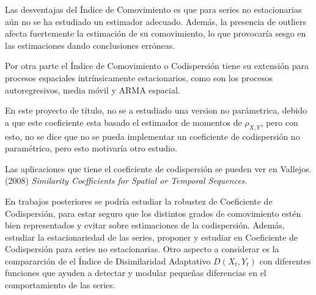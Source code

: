 Las desventajas del \'Indice de Comovimiento es que para series no estacionarias a\'un no se ha estudiado un estimador adecuado. Adem\'as, la presencia de outliers afecta fuertemente la estimaci\'on de su comovimiento, lo que provocar\'ia sesgo en las estimaciones dando conclusiones err\'oneas.

Por otra parte el \'Indice de Comovimiento o Codispersi\'on tiene su extensi\'on para procesos espaciales intr\'insicamente estacionarios, como son los procesos autoregresivos, media m\'ovil y ARMA espacial.

En este proyecto de t\'itulo, no se a estudiado una version no par\'ametrica, debido a que este coeficiente esta basado el estimador de momentos de $\rho_{X,Y}$, pero con esto, no se dice que no se pueda implementar un coeficiente de codispersi\'on no param\'etrico, pero esto motivar\'ia otro estudio.

Las aplicaciones que tiene el coeficiente de codispersi\'on se pueden ver en Vallejos. (2008) \textit{Similarity Coefficients for Spatial or Temporal Sequences.}

En trabajos posteriores se podr\'ia estudiar la robustez de Coeficiente de Codispersi\'on, para estar seguro que los distintos grados de comovimiento est\'en bien representados y evitar sobre estimaciones de la codispersi\'on. Adem\'as, estudiar la estacionariedad de las series, proponer y estudiar en Coeficiente de Codispersi\'on para series no estacionarias. Otro aspecto a considerar es la compararci\'on de el \'Indice de Disimilaridad Adaptativo $D({X_{t}},{Y_{t}})$ con diferentes funciones que ayuden a detectar y modular peque\~{n}as diferencias en el comportamiento de las series.






